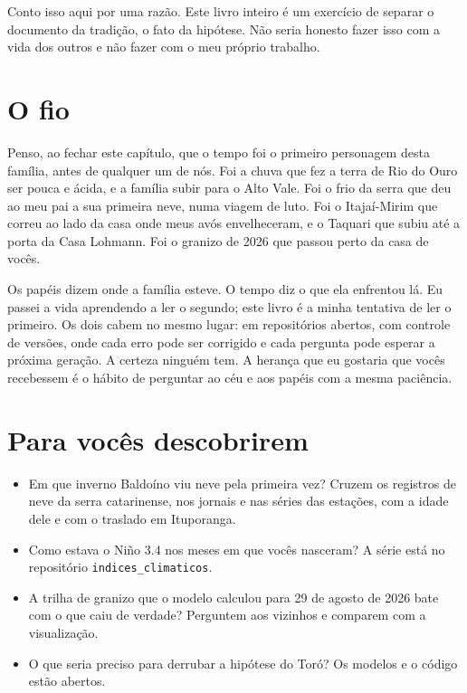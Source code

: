 \documentclass[
  brazilian,
  11pt,
  openany]{book}
\providecommand{\tightlist}{%
  \setlength{\itemsep}{0pt}\setlength{\parskip}{0pt}}
\begin{document}
Conto isso aqui por uma razão. Este livro inteiro é um exercício de
separar o documento da tradição, o fato da hipótese. Não seria honesto
fazer isso com a vida dos outros e não fazer com o meu próprio trabalho.

\section{O fio}\label{o-fio}

Penso, ao fechar este capítulo, que o tempo foi o primeiro personagem
desta família, antes de qualquer um de nós. Foi a chuva que fez a terra
de Rio do Ouro ser pouca e ácida, e a família subir para o Alto Vale.
Foi o frio da serra que deu ao meu pai a sua primeira neve, numa viagem
de luto. Foi o Itajaí-Mirim que correu ao lado da casa onde meus avós
envelheceram, e o Taquari que subiu até a porta da Casa Lohmann. Foi o
granizo de 2026 que passou perto da casa de vocês.

Os papéis dizem onde a família esteve. O tempo diz o que ela enfrentou
lá. Eu passei a vida aprendendo a ler o segundo; este livro é a minha
tentativa de ler o primeiro. Os dois cabem no mesmo lugar: em
repositórios abertos, com controle de versões, onde cada erro pode ser
corrigido e cada pergunta pode esperar a próxima geração. A certeza
ninguém tem. A herança que eu gostaria que vocês recebessem é o hábito
de perguntar ao céu e aos papéis com a mesma paciência.

\section{Para vocês descobrirem}\label{para-vocuxeas-descobrirem-13}

\begin{itemize}
\tightlist
\item
  Em que inverno Baldoíno viu neve pela primeira vez? Cruzem os
  registros de neve da serra catarinense, nos jornais e nas séries das
  estações, com a idade dele e com o traslado em Ituporanga.
\item
  Como estava o Niño 3.4 nos meses em que vocês nasceram? A série está
  no repositório \texttt{indices\_climaticos}.
\item
  A trilha de granizo que o modelo calculou para 29 de agosto de 2026
  bate com o que caiu de verdade? Perguntem aos vizinhos e comparem com
  a visualização.
\item
  O que seria preciso para derrubar a hipótese do Toró? Os modelos e o
  código estão abertos.
\end{itemize}
\end{document}
